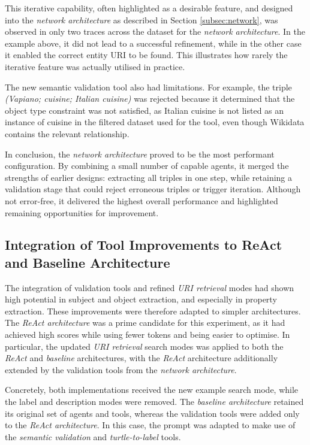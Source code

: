 \documentclass[a4paper,oneside,bibliography=totoc]{scrbook}
\begin{document}
This iterative capability, often highlighted as a desirable feature, and designed into the \textit{network architecture} as described in Section \ref{subsec:network}, was observed in only two traces across the dataset for the \textit{network architecture}. In the example above, it did not lead to a successful refinement, while in the other case it enabled the correct entity \ac{URI} to be found. This illustrates how rarely the iterative feature was actually utilised in practice.

The new semantic validation tool also had limitations. For example, the triple \textit{(Vapiano; cuisine; Italian cuisine)} was rejected because it determined that the object type constraint was not satisfied, as Italian cuisine is not listed as an instance of cuisine in the filtered dataset used for the tool, even though Wikidata contains the relevant relationship.

In conclusion, the \textit{network architecture} proved to be the most performant configuration. By combining a small number of capable agents, it merged the strengths of earlier designs: extracting all triples in one step, while retaining a validation stage that could reject erroneous triples or trigger iteration. Although not error-free, it delivered the highest overall performance and highlighted remaining opportunities for improvement.

\subsection{Integration of Tool Improvements to ReAct and Baseline Architecture}
\label{subsec:performance_increases_gen2}

The integration of validation tools and refined \textit{\ac{URI} retrieval} modes had shown high potential in subject and object extraction, and especially in property extraction. These improvements were therefore adapted to simpler architectures. The \textit{ReAct architecture} was a prime candidate for this experiment, as it had achieved high scores while using fewer tokens and being easier to optimise. In particular, the updated \textit{\ac{URI} retrieval} search modes was applied to both the \textit{ReAct} and \textit{baseline} architectures, with the \textit{ReAct} architecture additionally extended by the validation tools from the \textit{network architecture}.

Concretely, both implementations received the new example search mode, while the label and description modes were removed. The \textit{baseline architecture} retained its original set of agents and tools, whereas the validation tools were added only to the \textit{ReAct architecture}. In this case, the prompt was adapted to make use of the \textit{semantic validation} and \textit{turtle-to-label} tools.
\end{document}
